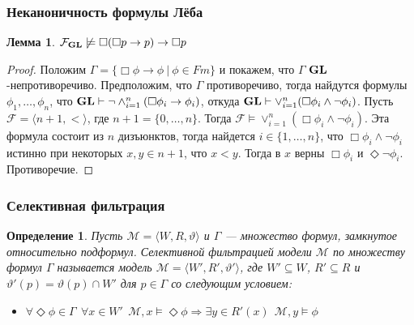 \documentclass[pdf,utf8,russian,aspectratio=169]{beamer}
\newtheorem{defin}{Определение}
\newtheorem{lem}{Лемма}
\begin{document}
\begin{frame}
  \frametitle{Неканоничность формулы Л\"{е}ба}

  \begin{lem}
    $\mathcal{F}_{\bf GL} \not\models \Box (\Box p \to p) \to \Box p$
  \end{lem}

  \begin{proof}
    Положим $\Gamma = \{ \Box \phi \to \phi \: | \: \phi \in Fm \}$ и покажем, что $\Gamma$ ${\bf GL}$-непротиворечиво.
    Предположим, что $\Gamma$ противоречиво, тогда найдутся формулы $\phi_1, \dots, \phi_n$, что ${\bf GL} \vdash \neg \land_{i = 1}^n (\Box \phi_i \to \phi_i)$,
    откуда ${\bf GL} \vdash \lor_{i=1}^{n} (\Box \phi_i \land \neg \phi_i)$. Пусть $\mathcal{F} = \langle n + 1, < \rangle$, где $n + 1 = \{ 0, \dots, n \}$.
    Тогда $\mathcal{F} \models \lor_{i=1}^{n} (\Box \phi_i \land \neg \phi_i)$. Эта формула состоит из $n$ дизъюнктов, тогда найдется $i \in \{ 1, \dots, n \}$,
    что $\Box \phi_i \land \neg \phi_i$ истинно при некоторых $x, y \in n + 1$, что $x < y$. Тогда в $x$ верны $\Box \phi_i$ и $\Diamond \neg \phi_i$. Противоречие.
  \end{proof}
\end{frame}

\begin{frame}
  \frametitle{Селективная фильтрация}
  \begin{defin}
    Пусть $\mathcal{M} = \langle W, R, \vartheta \rangle$ и $\Gamma$ --- множество формул, замкнутое относительно подформул.
    Селективной фильтрацией модели $\mathcal{M}$ по множеству формул $\Gamma$ называется модель $\mathcal{M} = \langle W', R', \vartheta' \rangle$, где
    $W' \subseteq W$, $R' \subseteq R$ и $\vartheta'(p) = \vartheta(p) \cap W'$ для $p \in \Gamma$ со следующим условием:

    \begin{itemize}
      \item $\forall \Diamond \phi \in \Gamma \:\: \forall x \in W' \:\: \mathcal{M}, x \models \Diamond \phi \Rightarrow \exists y \in R'(x) \:\: \mathcal{M}, y \models \phi$
    \end{itemize}
  \end{defin}
\end{frame}
\end{document}
